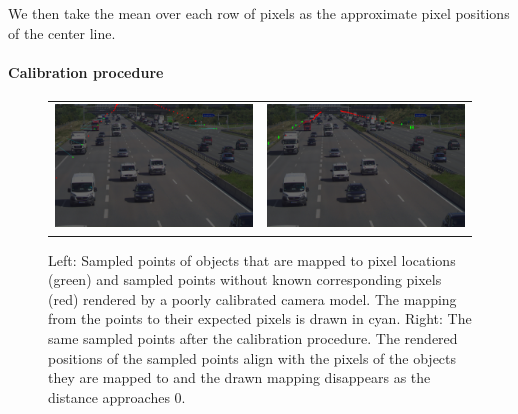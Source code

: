 We then take the mean over each row of pixels as the approximate pixel positions of the center line.


\paragraph{Calibration procedure}
\begin{figure}[!ht]
  \centering
  \begin{tabular}{cc}
    \includegraphics[width=0.4\linewidth]{images/calibration/background_uncalibrated_with_mapping.png}    &  
    \includegraphics[width=0.4\linewidth]{images/calibration/background_calibrated.png}    
  \end{tabular}
  \caption{Left: Sampled points of objects that are mapped to pixel locations (green) and sampled points without known corresponding pixels (red) rendered by a poorly calibrated camera model.
  The mapping from the points to their expected pixels is drawn in cyan.
  Right: The same sampled points after the calibration procedure.
  The rendered positions of the sampled points align with the pixels of the objects they are mapped to and the drawn mapping disappears as the distance approaches $0$.  }
  \label{fig:calibration}
  \end{figure}

